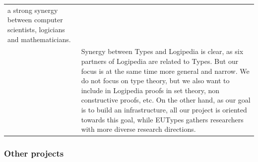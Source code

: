 \begin{longtable}{|p{}|p{}|}
a strong synergy between computer scientists, logicians and
mathematicians.
\\
&
\hspace{0.4cm}
Synergy between Types and Logipedia is clear, as six partners of
Logipedia are related to Types. But our focus is at the same time more
general and narrow. We do not focus on type theory, but we also want
to include in Logipedia proofs in set theory, non constructive proofs,
etc. On the other hand, as our goal is to build an infrastructure,
all our project is oriented towards this goal, while EUTypes gathers
researchers with more diverse research directions.
\\
\hline
\end{longtable}

\subsubsection*{Other projects}

